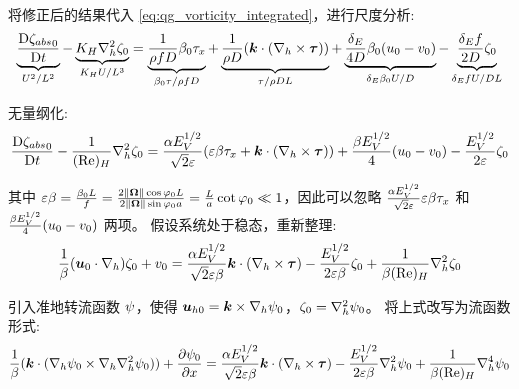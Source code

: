 将修正后的结果代入 \eqref{eq:qg_vorticity_integrated}，进行尺度分析:
\begin{equation*}
    \underbrace{\frac{\mathrm{D} {\zeta_{abs}}_0}{\mathrm{D} t}}_{U^2 / L^2} - \underbrace{K_H \nabla_h^2 \zeta_0}_{K_H U / L^3} = \underbrace{\frac{1}{\rho f D} \beta_0 \tau_x}_{\beta_0 \tau / \rho f D} + \underbrace{\frac{1}{\rho D} (\bm{k} \cdot (\nabla_h \times {\bm{\tau}}))}_{\tau / \rho D L} + \underbrace{\frac{\delta_E}{4 D} \beta_0 (u_0 - v_0)}_{\delta_E \beta_0 U / D} - \underbrace{\frac{\delta_E f}{2 D} \zeta_0}_{\delta_E f U / D L}
\end{equation*}

无量纲化:
\begin{equation*}
    \frac{\mathrm{D} {\zeta_{abs}}_0}{\mathrm{D} t} - \frac{1}{(\text{Re})_H} \nabla_h^2 \zeta_0 = \frac{\alpha E_V^{1/2}}{\sqrt{2} \varepsilon} (\varepsilon \beta \tau_x + \bm{k} \cdot (\nabla_h \times {\bm{\tau}})) + \frac{\beta E_V^{1/2}}{4} (u_0 - v_0) - \frac{E_V^{1/2}}{2 \varepsilon} \zeta_0
\end{equation*}

其中 $\varepsilon \beta = \frac{\beta_0 L}{f} = \frac{2 \lVert \bm{\Omega} \rVert \cos\varphi_0 L}{2 \lVert \bm{\Omega} \rVert \sin\varphi_0 a} = \frac{L}{a} \cot\varphi_0 \ll 1$，因此可以忽略 $\frac{\alpha E_V^{1/2}}{\sqrt{2} \varepsilon} \varepsilon \beta \tau_x$ 和 $\frac{\beta E_V^{1/2}}{4} (u_0 - v_0)$ 两项。
假设系统处于稳态，重新整理:
\begin{equation*}
    \frac{1}{\beta} (\bm{u}_0 \cdot \nabla_h) \zeta_0 +  v_0 = \frac{\alpha E_V^{1/2}}{\sqrt{2} \varepsilon \beta} \bm{k} \cdot (\nabla_h \times {\bm{\tau}}) - \frac{E_V^{1/2}}{2 \varepsilon \beta} \zeta_0 + \frac{1}{\beta (\text{Re})_H} \nabla_h^2 \zeta_0
\end{equation*}

引入准地转流函数 $\psi$，使得 $\bm{u}_{h0} = \bm{k} \times \nabla_h \psi_0$，$\zeta_0 = \nabla_h^2 \psi_0$。
将上式改写为流函数形式:
\begin{equation*}
    \frac{1}{\rossby} (\kvec \cdot (\nabla_h \streamfunc_0 \times \nabla_h \nabla_h^2 \streamfunc_0)) + \pde{\streamfunc_0}{x} = \frac{\alpha \ev^{1/2}}{\sqrt{2} \ro \rossby} \kvec \cdot (\nabla_h \times \wind) - \frac{\ev^{1/2}}{2 \ro \rossby} \nabla_h^2 \streamfunc_0 + \frac{1}{\rossby (\re)_H} \nabla_h^4 \streamfunc_0
\end{equation*}

